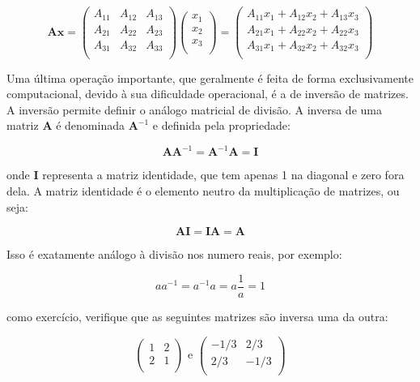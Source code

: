\documentclass[portuges,]{tufte-handout}
\begin{document}
\[
\mathbf{A}\mathbf{x}  =
\left (
\begin{matrix}
A_{11} & A_{12} & A_{13}\\
A_{21} & A_{22} & A_{23} \\
A_{31} & A_{32} & A_{33}\\
\end{matrix}
\right )
\left (
\begin{matrix}
x_{1}  \\
x_{2}   \\
x_{3}  \\
\end{matrix}
\right )
=
\left (
\begin{matrix}
A_{11}x_{1} +  A_{12}x_{2} +  A_{13}x_{3}\\
A_{21}x_{1} +  A_{22}x_{2} +  A_{22}x_{3}\\
A_{31}x_{1} +  A_{32}x_{2} +  A_{32}x_{3}\\
\end{matrix}
\right )
\]

Uma última operação importante, que geralmente é feita de forma
exclusivamente computacional, devido à sua dificuldade operacional, é a
de inversão de matrizes. A inversão permite definir o análogo matricial
de divisão. A inversa de uma matriz \(\mathbf{A}\) é denominada
\(\mathbf{A}^{-1}\) e definida pela propriedade:

\[
\mathbf{A}\mathbf{A}^{-1} = \mathbf{A}^{-1}\mathbf{A} = \mathbf{I}
\]

onde \(\mathbf{I}\) representa a matriz identidade, que tem apenas 1 na
diagonal e zero fora dela. A matriz identidade é o elemento neutro da
multiplicação de matrizes, ou seja:

\[
\mathbf{A}\mathbf{I} = \mathbf{I}\mathbf{A} = \mathbf{A}
\]

Isso é exatamente análogo à divisão nos numero reais, por exemplo:

\[
aa^{-1} = a^{-1}a = a\frac{1}{a} = 1
\]

como exercício, verifique que as seguintes matrizes são inversa uma da
outra:

\[
\left (
\begin{matrix}
1 & 2 \\
2 & 1 \\
\end{matrix}
\right )
\text{ e }
\left (
\begin{matrix}
-1/3 & 2/3 \\
2/3 & -1/3 \\
\end{matrix}
\right )
\]
\end{document}

